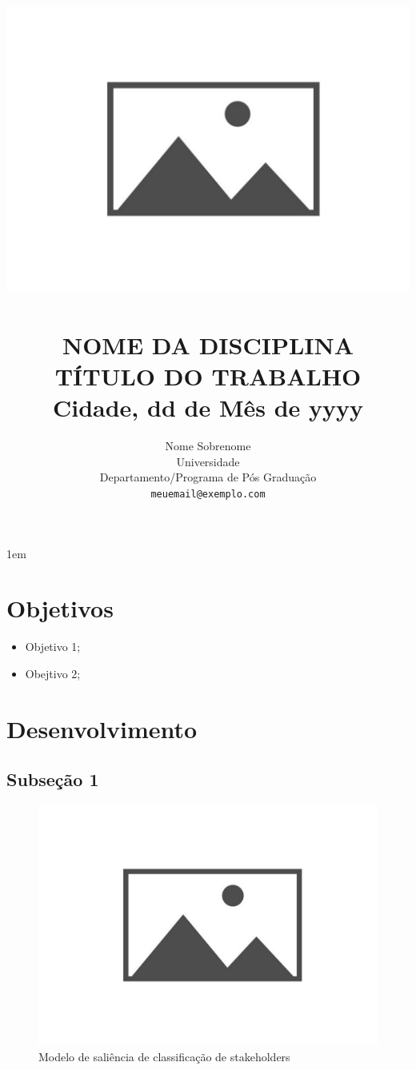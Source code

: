 \documentclass[paper=a4, fontsize=11pt,twoside]{scrartcl}		%
\title{	\normalsize \textsc{} 	%
			\includegraphics[scale=.2]{logo.pdf}\\[1cm]             %
			\HRule{0.5pt} \\					%
			\LARGE \textbf{\uppercase{Nome da Disciplina}} \\	%
			\large \textbf{\uppercase{Título do Trabalho}}	        %
		    \HRule{2pt}  					%
			\\[0.5cm]
			\normalsize Cidade, dd de Mês de yyyy%
		}
\author{
		Nome Sobrenome\\	
		Universidade\\	
		Departamento/Programa de Pós Graduação\\
        \texttt{meuemail@exemplo.com} \\
}
\makeatletter
\def\printtitle{%
    {\centering \@title\par}}
\def\printauthor{%
    {\centering \large \@author}}
\makeatother
\begin{document}
\thispagestyle{empty}				%

\printtitle					%
  	\vfil
\printauthor					%
\newpage
\tableofcontents
\newpage
\openup 1em
\section{Objetivos}

\lipsum[1]

\begin{itemize}
    \item Objetivo 1;
    \item Obejtivo 2;
\end{itemize}

\section{Desenvolvimento}

\subsection{Subseção 1}

\lipsum[4-7]


\begin{figure}
  \centering
  \includegraphics[width=0.8\linewidth]{./logo.pdf}
  \caption{Modelo de saliência de classificação de stakeholders \cite{apostilafgv}}
  \label{fig:quad}
\end{figure}
\end{document}
